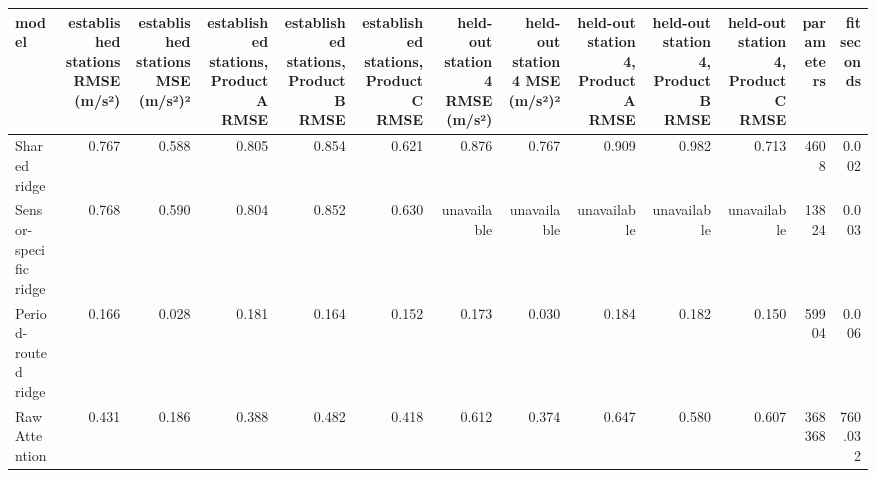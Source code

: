 \begin{tabular}{lrrrrrrrrrrrr}
\toprule
model & established stations RMSE (m/s²) & established stations MSE (m/s²)² & established stations, Product A RMSE & established stations, Product B RMSE & established stations, Product C RMSE & held-out station 4 RMSE (m/s²) & held-out station 4 MSE (m/s²)² & held-out station 4, Product A RMSE & held-out station 4, Product B RMSE & held-out station 4, Product C RMSE & parameters & fit seconds \\
\midrule
Shared ridge & 0.767 & 0.588 & 0.805 & 0.854 & 0.621 & 0.876 & 0.767 & 0.909 & 0.982 & 0.713 & 4608 & 0.002 \\
Sensor-specific ridge & 0.768 & 0.590 & 0.804 & 0.852 & 0.630 & unavailable & unavailable & unavailable & unavailable & unavailable & 13824 & 0.003 \\
Period-routed ridge & 0.166 & 0.028 & 0.181 & 0.164 & 0.152 & 0.173 & 0.030 & 0.184 & 0.182 & 0.150 & 59904 & 0.006 \\
Raw Attention & 0.431 & 0.186 & 0.388 & 0.482 & 0.418 & 0.612 & 0.374 & 0.647 & 0.580 & 0.607 & 368368 & 760.032 \\
\bottomrule
\end{tabular}
